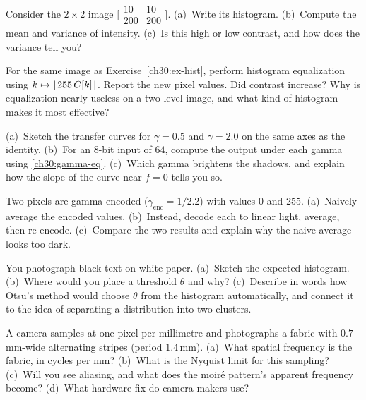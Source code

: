 \begin{exercise}
\label{ch30:ex-hist}
Consider the $2\times 2$ image $\big[\begin{smallmatrix}10&10\\200&200\end{smallmatrix}\big]$.
(a)~Write its histogram. (b)~Compute the mean and variance of intensity. (c)~Is
this high or low contrast, and how does the variance tell you?
\end{exercise}

\begin{exercise}
\label{ch30:ex-equalize}
For the same image as Exercise~\ref{ch30:ex-hist}, perform histogram equalization
using $k\mapsto\lfloor255\,C[k]\rfloor$. Report the new pixel values. Did contrast
increase? Why is equalization nearly useless on a two-level image, and what kind
of histogram makes it most effective?
\end{exercise}

\begin{exercise}
\label{ch30:ex-gamma}
(a)~Sketch the transfer curves for $\gamma=0.5$ and $\gamma=2.0$ on the same axes
as the identity. (b)~For an 8-bit input of $64$, compute the output under each
gamma using \eqref{ch30:gamma-eq}. (c)~Which gamma brightens the shadows, and
explain how the slope of the curve near $f=0$ tells you so.
\end{exercise}

\begin{exercise}
\label{ch30:ex-gammablend}
Two pixels are gamma-encoded ($\gamma_{\text{enc}}=1/2.2$) with values $0$ and
$255$. (a)~Naively average the encoded values. (b)~Instead, decode each to linear
light, average, then re-encode. (c)~Compare the two results and explain why the
naive average looks too dark.
\end{exercise}

\begin{exercise}
\label{ch30:ex-threshold}
You photograph black text on white paper. (a)~Sketch the expected histogram.
(b)~Where would you place a threshold $\theta$ and why? (c)~Describe in words how
Otsu's method would choose $\theta$ from the histogram automatically, and connect
it to the idea of separating a distribution into two clusters.
\end{exercise}

\begin{exercise}
\label{ch30:ex-alias}
A camera samples at one pixel per millimetre and photographs a fabric with
$0.7$\,mm-wide alternating stripes (period $1.4$\,mm). (a)~What spatial frequency
is the fabric, in cycles per mm? (b)~What is the Nyquist limit for this sampling?
(c)~Will you see aliasing, and what does the moir\'e pattern's apparent frequency
become? (d)~What hardware fix do camera makers use?
\end{exercise}

